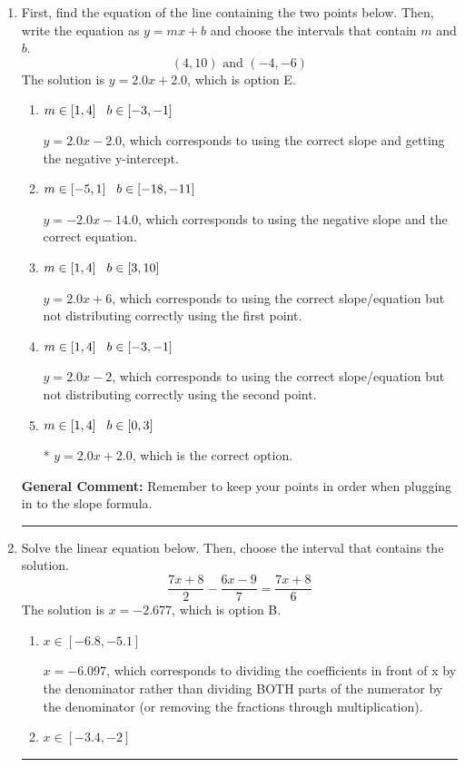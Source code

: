 \documentclass{extbook}[14pt]
\newcommand{\litem}[1]{\item #1

\rule{\textwidth}{0.4pt}}
\begin{document}
\begin{enumerate}\litem{
First, find the equation of the line containing the two points below. Then, write the equation as $ y=mx+b $ and choose the intervals that contain $m$ and $b$.
\[ (4, 10) \text{ and } (-4, -6) \]The solution is \( y = 2.0x + 2.0 \), which is option E.\begin{enumerate}[label=\Alph*.]
\item \( m \in [1, 4] \hspace*{3mm} b \in [-3, -1] \)

 $y = 2.0x -2.0$, which corresponds to using the correct slope and getting the negative y-intercept.
\item \( m \in [-5, 1] \hspace*{3mm} b \in [-18, -11] \)

 $y = -2.0x -14.0$, which corresponds to using the negative slope and the correct equation.
\item \( m \in [1, 4] \hspace*{3mm} b \in [3, 10] \)

 $y = 2.0x + 6$, which corresponds to using the correct slope/equation but not distributing correctly using the first point.
\item \( m \in [1, 4] \hspace*{3mm} b \in [-3, -1] \)

 $y = 2.0x -2$, which corresponds to using the correct slope/equation but not distributing correctly using the second point.
\item \( m \in [1, 4] \hspace*{3mm} b \in [0, 3] \)

* $y = 2.0x + 2.0$, which is the correct option.
\end{enumerate}

\textbf{General Comment:} Remember to keep your points in order when plugging in to the slope formula.
}
\litem{
Solve the linear equation below. Then, choose the interval that contains the solution.
\[ \frac{7x + 8}{2} - \frac{6x -9}{7} = \frac{7x + 8}{6} \]The solution is \( x = -2.677 \), which is option B.\begin{enumerate}[label=\Alph*.]
\item \( x \in [-6.8, -5.1] \)

 $x = -6.097$, which corresponds to dividing the coefficients in front of x by the denominator rather than dividing BOTH parts of the numerator by the denominator (or removing the fractions through multiplication).
\item \( x \in [-3.4, -2] \)


\end{enumerate}}
\end{enumerate}
\end{document}
